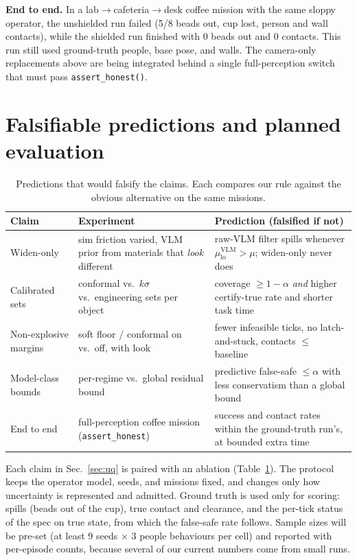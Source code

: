 \documentclass[10pt,twocolumn,letterpaper]{article}
\begin{document}
\textbf{End to end.} In a lab$\to$cafeteria$\to$desk coffee mission with the same sloppy operator, the unshielded run failed (5/8 beads
out, cup lost, person and wall contacts), while the shielded run finished with 0 beads out and 0 contacts. This run still used ground-truth
people, base pose, and walls. The camera-only replacements above are being integrated behind a single full-perception switch that must pass
\texttt{assert\_honest()}.


\section{Falsifiable predictions and planned evaluation}
\begin{table}[t]
\centering\footnotesize
\caption{Predictions that would falsify the claims. Each compares our rule against the obvious alternative on the same missions.}
\label{tab:pred}
\begin{tabular}{@{}p{1.15cm}p{3.0cm}p{3.35cm}@{}}
\toprule
Claim & Experiment & Prediction (falsified if not)\\
\midrule
Widen-only & sim friction varied, VLM prior from materials that \emph{look} different & raw-VLM filter spills whenever $\mu_{\mathrm{lo}}^{\mathrm{VLM}}>\mu$; widen-only never does\\
Calibrated sets & conformal vs.\ $k\sigma$ vs.\ engineering sets per object & coverage $\ge1-\alpha$ \emph{and} higher certify-true rate and shorter task time\\
Non-explosive margins & soft floor / conformal on vs.\ off, with look & fewer infeasible ticks, no latch-and-stuck, contacts $\le$ baseline\\
Model-class bounds & per-regime vs.\ global residual bound & predictive false-safe $\le\alpha$ with less conservatism than a global bound\\
End to end & full-perception coffee mission (\texttt{assert\_honest}) & success and contact rates within the ground-truth run's, at bounded extra time\\
\bottomrule
\end{tabular}
\end{table}
Each claim in Sec.~\ref{sec:uq} is paired with an ablation (Table~\ref{tab:pred}). The protocol keeps the operator model, seeds, and
missions fixed, and changes only how uncertainty is represented and admitted. Ground truth is used only for scoring: spills (beads out of
the cup), true contact and clearance, and the per-tick status of the spec on true state, from which the false-safe rate follows. Sample
sizes will be pre-set (at least 9 seeds $\times$ 3 people behaviours per cell) and reported with per-episode counts, because several of our
current numbers come from small runs.
\end{document}

